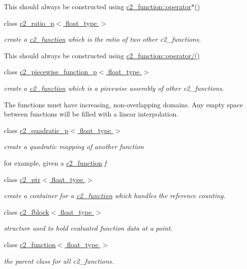 \begin{DoxyCompactItemize}
\begin{DoxyCompactList}
This should always be constructed using \hyperlink{classc2__function_a7744675c98a8ec63320ac1c0b61bec9c}{c2\-\_\-function\-::operator$\ast$()} \end{DoxyCompactList}\item 
class \hyperlink{classc2__ratio__p}{c2\-\_\-ratio\-\_\-p$<$ float\-\_\-type $>$}
\begin{DoxyCompactList}\small\item\em create a \hyperlink{classc2__function}{c2\-\_\-function} which is the ratio of two other c2\-\_\-functions.

This should always be constructed using \hyperlink{classc2__function_a93ac28dfe5daebea84d147b8e346e60c}{c2\-\_\-function\-::operator/()} \end{DoxyCompactList}\item 
class \hyperlink{classc2__piecewise__function__p}{c2\-\_\-piecewise\-\_\-function\-\_\-p$<$ float\-\_\-type $>$}
\begin{DoxyCompactList}\small\item\em create a \hyperlink{classc2__function}{c2\-\_\-function} which is a piecewise assembly of other c2\-\_\-functions.

The functions must have increasing, non-\/overlapping domains. Any empty space between functions will be filled with a linear interpolation. \end{DoxyCompactList}\item 
class \hyperlink{classc2__quadratic__p}{c2\-\_\-quadratic\-\_\-p$<$ float\-\_\-type $>$}
\begin{DoxyCompactList}\small\item\em create a quadratic mapping of another function

for example, given a \hyperlink{classc2__function}{c2\-\_\-function} {\itshape f} \end{DoxyCompactList}\item 
class \hyperlink{classc2__ptr}{c2\-\_\-ptr$<$ float\-\_\-type $>$}
\begin{DoxyCompactList}\small\item\em create a container for a \hyperlink{classc2__function}{c2\-\_\-function} which handles the reference counting. \end{DoxyCompactList}\item 
class \hyperlink{classc2__fblock}{c2\-\_\-fblock$<$ float\-\_\-type $>$}
\begin{DoxyCompactList}\small\item\em structure used to hold evaluated function data at a point. \end{DoxyCompactList}\item 
class \hyperlink{classc2__function}{c2\-\_\-function$<$ float\-\_\-type $>$}
\begin{DoxyCompactList}\small\item\em the parent class for all c2\-\_\-functions.


\end{DoxyCompactList}
\end{DoxyCompactItemize}
